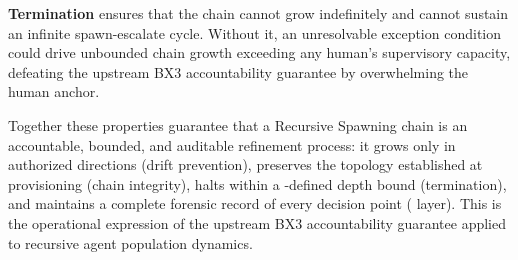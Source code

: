 \textbf{Termination} ensures that the chain cannot grow indefinitely and cannot sustain an infinite spawn-escalate cycle. Without it, an unresolvable exception condition could drive unbounded chain growth exceeding any human's supervisory capacity, defeating the upstream BX3 accountability guarantee by overwhelming the human anchor.

Together these properties guarantee that a Recursive Spawning chain is an accountable, bounded, and auditable refinement process: it grows only in authorized directions (drift prevention), preserves the topology established at provisioning (chain integrity), halts within a \purpose{}-defined depth bound (termination), and maintains a complete forensic record of every decision point (\fact{} layer). This is the operational expression of the upstream BX3 accountability guarantee applied to recursive agent population dynamics.
